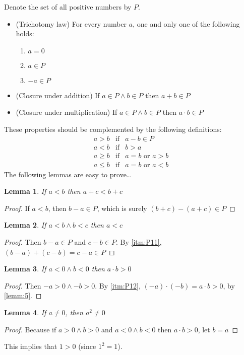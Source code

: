 \documentclass[a4paper,11pt,twoside]{book}
\theoremstyle{plain} \newtheorem{id}{Lemma}
\theoremstyle{remark} \newtheorem*{ab}{Remark}
\begin{document}
  Denote the set of all positive numbers by $P$.
  \begin{itemize}[label=\textnormal{(\arabic*)}]
    \item[\mylabel{itm:P10}{(P10)}](Trichotomy law)
    For every number $a$, one and only one of the following
    holds:
    \begin{enumerate}[label=(\roman*)]
      \item $a=0$
      \item $a\in P$
      \item $-a\in P$
    \end{enumerate}
    \item[\mylabel{itm:P11}{(P11)}](Closure under addition)
    If $a\in P \land b\in P$ then $a+b\in P$
    \item[\mylabel{itm:P12}{(P12)}](Closure under multiplication)
    If $a\in P \land b\in P$ then $a\cdot b \in P$
  \end{itemize}
  These properties should be complemented by the following
  definitions:
  \begin{equation*}
    \begin{array}{rcl}
      a>b & \text{if} & a-b \in P \\
      a<b & \text{if} & b>a \\
      a\geq b & \text{if} & a=b \text{ or } a>b\\
      a\leq b & \text{if} & a=b \text{ or } a<b
    \end{array}
  \end{equation*}
  The following lemmas are easy to prove\ldots
  \begin{id}
    If $a<b$ then $a+c<b+c$
  \end{id}
  \begin{proof}
    If $a<b$, then $b-a\in P$, which is surely $(b+c)-(a+c)
    \in P$
  \end{proof}
  \begin{id}
    If $a<b \land b<c$ then $a<c$
  \end{id}
  \begin{proof}
    Then $b-a \in P$ and $c-b \in P$. By \ref{itm:P11},
    $(b-a)+(c-b)=c-a\in P$
  \end{proof}
  \begin{id}
    If $a<0 \land b<0$ then $a\cdot b>0$
  \end{id}
  \begin{proof}
    Then $-a>0 \land -b>0$. By \ref{itm:P12}, $(-a)\cdot
    (-b)=a\cdot b>0$, by \autoref{lemm:5}.
  \end{proof}
  \begin{id}
    If $a\neq 0$, then $a^2\neq 0$
  \end{id}
  \begin{proof}
    Because if $a>0 \land b>0$ and $a<0 \land b<0$ then
    $a\cdot b>0$, let $b=a$
  \end{proof}
  This implies that $1>0$ (since $1^2=1$).
\end{document}
